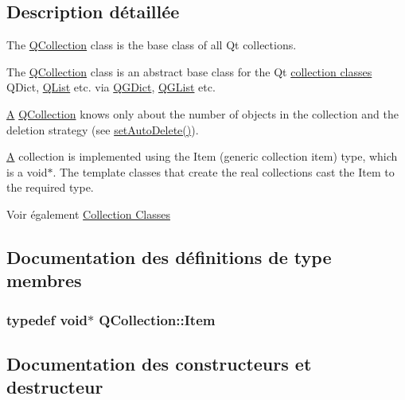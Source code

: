\subsection{Description détaillée}
The \hyperlink{class_q_collection}{Q\+Collection} class is the base class of all Qt collections. 

The \hyperlink{class_q_collection}{Q\+Collection} class is an abstract base class for the Qt \hyperlink{}{collection classes} Q\+Dict, \hyperlink{class_q_list}{Q\+List} etc. via \hyperlink{class_q_g_dict}{Q\+G\+Dict}, \hyperlink{class_q_g_list}{Q\+G\+List} etc.

\hyperlink{class_a}{A} \hyperlink{class_q_collection}{Q\+Collection} knows only about the number of objects in the collection and the deletion strategy (see \hyperlink{class_q_collection_a6ed41913c76bfba54be6da26015ee3f3}{set\+Auto\+Delete()}).

\hyperlink{class_a}{A} collection is implemented using the {\ttfamily Item} (generic collection item) type, which is a {\ttfamily void$\ast$}. The template classes that create the real collections cast the {\ttfamily Item} to the required type.

\begin{DoxySeeAlso}{Voir également}
\hyperlink{}{Collection Classes} 
\end{DoxySeeAlso}


\subsection{Documentation des définitions de type membres}
\hypertarget{class_q_collection_ac6f3ddbf999e31fb797927f71ae6b5d7}{}
\subsubsection[{Item}]{\setlength{\rightskip}{0pt plus 5cm}typedef void$\ast$ {\bf Q\+Collection\+::\+Item}}\label{class_q_collection_ac6f3ddbf999e31fb797927f71ae6b5d7}


\subsection{Documentation des constructeurs et destructeur}
\hypertarget{class_q_collection_ab66048255d5340ef60bd8f4cc32d301d}{}
